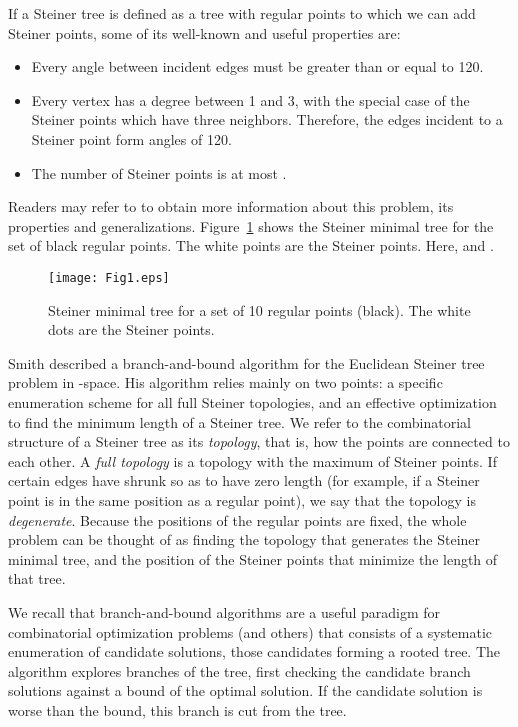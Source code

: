 \documentclass{article}
\theoremstyle{plain}
\begin{document}
If a Steiner tree is defined as a tree with  regular points to which we can add  Steiner points, some of its well-known and useful properties \cite{Gilbert} are:
\begin{itemize}
\item{Every angle between incident edges must be greater than or equal to 120\degree.}
\item{Every vertex has a degree between 1 and 3, with the special case of the Steiner points which have three neighbors. Therefore, the edges incident to a Steiner point form angles of 120\degree. }
\item{The number  of Steiner points is at most .}
\end{itemize} 
Readers may refer to \cite{ref4} to obtain more information about this problem, its properties and generalizations. Figure~\ref{Fig1} shows the Steiner minimal tree for the set of black regular points. The white points are the Steiner points. Here,  and . 

\begin{figure}
\centering
\texttt{[image: Fig1.eps]}
\caption{Steiner minimal tree for a set of 10 regular points (black). The white dots are the Steiner points\label{Fig1}.}
\end{figure}


Smith \cite{Smith} described a \mbox{branch-and-bound} algorithm for the Euclidean Steiner tree problem in -space. His algorithm relies mainly on two points: a specific enumeration scheme for all full Steiner topologies, and an effective optimization to find the minimum length of a Steiner tree. We refer to the combinatorial structure of a Steiner tree as its \emph{topology}, that is, how the points are connected to each other. 
A \emph{full topology} is a topology with the maximum of  Steiner points. If certain edges have shrunk so as to have zero length (for example, if a Steiner point is in the same position as a regular point), we say that the topology is \emph{degenerate}.
Because the positions of the regular points are fixed, the whole problem can be thought of as finding the topology that generates the Steiner minimal tree, and the position of the Steiner points that minimize the length of that tree.

We recall that \mbox{branch-and-bound} algorithms are a useful paradigm for combinatorial optimization problems (and others) that consists of a systematic enumeration of candidate solutions, those candidates forming a rooted tree. 
The algorithm explores branches of the tree, first checking the candidate branch solutions against a bound of the optimal solution. 
If the candidate solution is worse than the bound, this branch is cut from the tree. 
\end{document}
